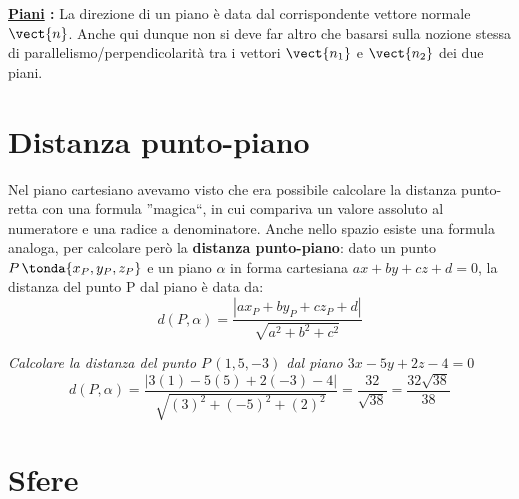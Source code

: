 \vspace{7pt}

\textbf{\underline{Piani} :} \; La direzione di un piano è data dal corrispondente vettore normale \(\vect{n}\). Anche qui dunque non si deve far altro che basarsi sulla nozione stessa di parallelismo/perpendicolarità tra i vettori \(\vect{n_1}\) e \(\vect{n_2}\) dei due piani.

\section{Distanza punto-piano}

Nel piano cartesiano avevamo visto che era possibile calcolare la distanza punto-retta con una formula ''magica``, in cui compariva un valore assoluto al numeratore e una radice a denominatore. Anche nello spazio esiste una formula analoga, per calcolare però la \textbf{distanza punto-piano}: dato un punto \(P\,\tonda{x_P,y_P,z_P}\) e un piano \(\alpha\) in forma cartesiana \(ax+by+cz+d=0\), la distanza del punto P dal piano è data da:
\[d(P,\alpha) = \frac{|ax_P+by_P+cz_P+d|}{\sqrt{a^2+b^2+c^2}}\]
\begin{esempio}
 \emph{Calcolare la distanza del punto \(P\,(1,5,-3)\) dal piano \(3x-5y+2z-4=0\)}\\[5pt]
 \[d(P,\alpha)=\frac{|3 (1)-5(5)+2(-3)-4|}{\sqrt{(3)^2+(-5)^2+(2)^2}} = \frac{32}{\sqrt{38}} = \frac{32 \sqrt{38}}{38}\]
\end{esempio}



\section{Sfere}

